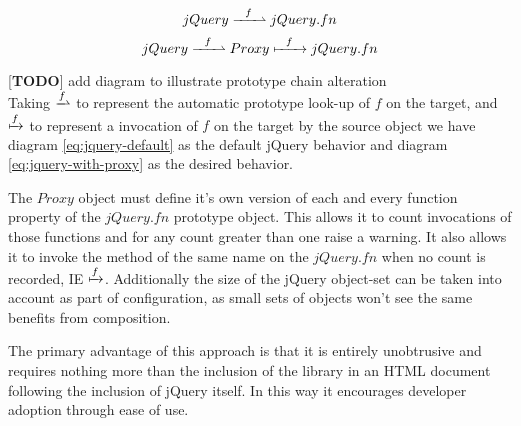 \documentclass[preprint, leqno]{sigplanconf}
\begin{document}
\begin{figure}[!ht]
\begin{equation} \label{eq:jquery-default}
 jQuery \xrightharpoonup{\ \ f\ \ } jQuery.fn
\end{equation}
\begin{equation} \label{eq:jquery-with-proxy}
 jQuery \xrightharpoonup{\ \ f\ \ } Proxy \xmapsto{\ \ f\ \ } jQuery.fn
\end{equation}
\end{figure}

[\textbf{TODO}] add diagram to illustrate prototype chain alteration
\\

Taking \begin{math}\xrightharpoonup{f}\end{math} to represent the automatic prototype look-up of \begin{math}f\end{math} on the target, and \begin{math}\xmapsto{f}\end{math} to represent a invocation of \begin{math}f\end{math} on the target by the source object we have diagram \ref{eq:jquery-default} as the default jQuery behavior and diagram \ref{eq:jquery-with-proxy} as the desired behavior.

The \begin{math}Proxy\end{math} object must define it's own version of each and every function property of the \begin{math}jQuery.fn\end{math} prototype object. This allows it to count invocations of those functions and for any count greater than one raise a warning. It also allows it to invoke the method of the same name on the \begin{math}jQuery.fn\end{math} when no count is recorded, IE \begin{math}\xmapsto{f}\end{math}. Additionally the size of the jQuery object-set can be taken into account as part of configuration, as small sets of objects won't see the same benefits from composition.

The primary advantage of this approach is that it is entirely unobtrusive and requires nothing more than the inclusion of the library in an HTML document following the inclusion of jQuery itself. In this way it encourages developer adoption through ease of use.
\end{document}
